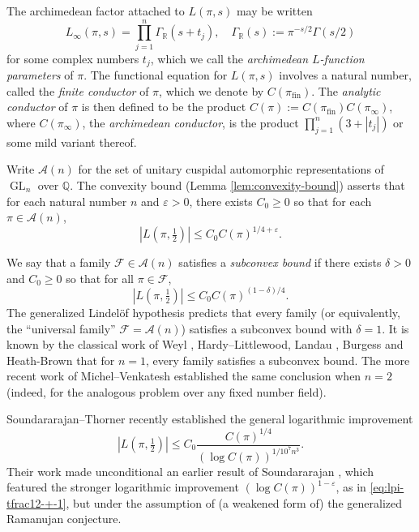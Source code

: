 \documentclass[reqno]{amsart}
\DeclareMathOperator{\GL}{GL}
\def\eps{\varepsilon}
\DeclareMathOperator{\fin}{fin}
\theoremstyle{plain} \newtheorem{theorem} {Theorem}
\theoremstyle{definition} \newtheorem{definition} [theorem] {Definition}
\theoremstyle{itplain} %
\numberwithin{equation}{section}
\numberwithin{theorem}{section}
\renewcommand{\geq}{\geqslant}
\renewcommand{\leq}{\leqslant}
\begin{document}
The archimedean factor attached to $L(\pi,s)$ may be written
\begin{equation}\label{eqn:L-infinity}
  L_\infty(\pi,s) =
  \prod_{j=1}^{n}
  \Gamma_\mathbb{R}(s + t_j),
  \quad
  \Gamma_{\mathbb{R}}(s) := \pi^{-s/2} \Gamma(s/2)
\end{equation}
for some complex numbers $t_j$, which we call the \emph{archimedean $L$-function parameters} of $\pi$.  The functional equation for $L(\pi,s)$ involves a natural number, called the \emph{finite conductor} of $\pi$, which we denote by $C(\pi_{\fin})$.  The \emph{analytic conductor} of $\pi$ \cite{MR1826269} is then defined to be the product $C(\pi) := C(\pi_{\fin}) C(\pi_\infty)$, where $C(\pi_\infty)$, the \emph{archimedean conductor}, is the product $\prod_{j=1}^n (3 + |t_j|)$ or some mild variant thereof.

Write $\mathcal{A}(n)$ for the set of unitary cuspidal automorphic representations of $\GL_n$ over $\mathbb{Q}$.  The convexity bound (Lemma \ref{lem:convexity-bound}) asserts that for each natural number $n$ and $\eps > 0$, there exists $C_0 \geq 0$ so that for each $\pi \in \mathcal{A}(n)$,
\begin{equation*}
  |L(\pi,\tfrac{1}{2})| \leq C_0 C(\pi)^{1/4+\eps}.
\end{equation*}

We say that a family $\mathcal{F} \in \mathcal{A}(n)$ satisfies a \emph{subconvex bound} if there exists $\delta > 0$ and $C_0 \geq 0$ so that for all $\pi \in \mathcal{F}$,
\begin{equation*}
  |L(\pi, \tfrac{1}{2} )| \leq C_0 C(\pi)^{(1 - \delta)/4}.
\end{equation*}
The generalized Lindel\"{o}f hypothesis predicts that every family (or equivalently, the ``universal family'' $\mathcal{F} = \mathcal{A}(n)$) satisfies a subconvex bound with $\delta = 1$.  It is known by the classical work of Weyl \cite{MR1511862}, Hardy--Littlewood, Landau \cite{MR1544665}, Burgess \cite{Bur57} and Heath-Brown \cite{MR485727}  that for $n = 1$, every family satisfies a subconvex bound.  The more recent work of Michel--Venkatesh \cite{michel-2009} established the same conclusion when $n=2$ (indeed, for the analogous problem over any fixed number field).

Soundararajan--Thorner \cite{MR3953433} recently established the general logarithmic improvement
\begin{equation}\label{eq:lpi-tfrac12-leq-2}
  |L(\pi,\tfrac{1}{2})| \leq C_0 \frac{C(\pi)^{1/4}}{(\log C(\pi))^{1/10^7 n^3}}.
\end{equation}
Their work made unconditional an earlier result of Soundararajan \cite[Thm 1]{MR2680497}, which featured the stronger logarithmic improvement $(\log C(\pi))^{1-\eps}$, as in \eqref{eq:lpi-tfrac12-+-1}, but under the assumption of (a weakened form of) the generalized Ramanujan conjecture.
\end{document}

